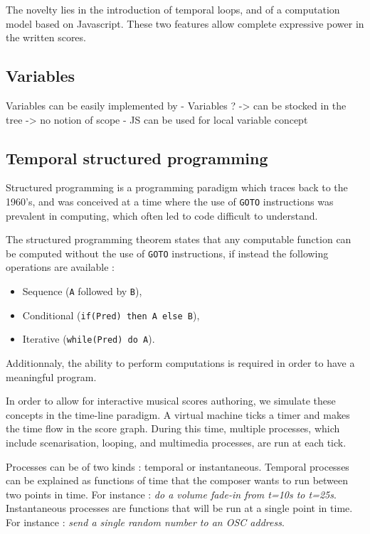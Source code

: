 \documentclass{article}
\begin{document}
The novelty lies in the introduction of temporal loops, and of a computation model 
based on Javascript. These two features allow complete expressive power in the 
written scores.

\subsection{Variables}
Variables can be easily implemented by 
- Variables ? 
-> can be stocked in the tree
-> no notion of scope
- JS can be used for local variable concept
\subsection{Temporal structured programming}
Structured programming is a programming paradigm which traces 
back to the 1960's, and was conceived at a time where the use of \lstinline{GOTO}
instructions was prevalent in computing, which often led to code difficult to understand.

The structured programming theorem\cite{bohm1966flow,mills1972mathematical} states that any computable function can be computed 
without the use of \lstinline{GOTO} instructions, if instead the following operations are available : 
\begin{itemize}
    \item Sequence (\lstinline{A} followed by \lstinline{B}), 
    \item Conditional (\lstinline{if(Pred) then A else B}), 
    \item Iterative (\verb|while(Pred) do A|).
\end{itemize}

Additionnaly, the ability to perform computations is required in order to have a meaningful program.

In order to allow for interactive musical scores authoring, we simulate these concepts in the time-line paradigm.
A virtual machine ticks a timer and makes the time flow in the score graph. 
During this time, multiple processes, which include scenarisation, looping, and multimedia processes, are 
run at each tick. 

Processes can be of two kinds : temporal or instantaneous.
Temporal processes can be explained as functions of time that the composer wants to run between 
two points in time. 
For instance : \emph{do a volume fade-in from t=10s to t=25s}.~\\
Instantaneous processes are functions that will be run at a single point in time.
For instance : \emph{send a single random number to an OSC address}.
\end{document}
